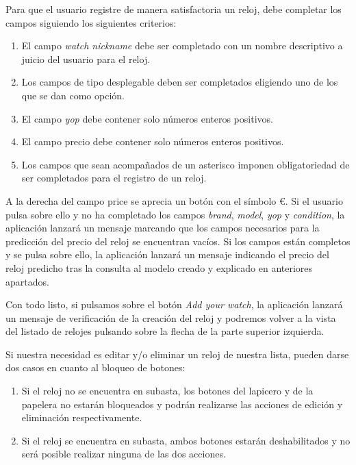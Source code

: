 
	Para que el usuario registre de manera satisfactoria un reloj, debe completar los campos siguiendo los siguientes criterios:
	
	\begin{enumerate}
		\item El campo \emph{watch nickname} debe ser completado con un nombre descriptivo a juicio del usuario para el reloj.
		\item Los campos de tipo desplegable deben ser completados eligiendo uno de los que se dan como opción.
		\item El campo \emph{yop} debe contener solo números enteros positivos.
		\item El campo precio debe contener solo números enteros positivos.
		\item Los campos que sean acompañados de un asterisco imponen obligatoriedad de ser completados para el registro de un reloj.
	\end{enumerate}
	
	A la derecha del campo price se aprecia un botón con el símbolo €. Si el usuario pulsa sobre ello y no ha completado los campos \emph{brand}, \emph{model}, \emph{yop} y \emph{condition}, la aplicación lanzará un mensaje marcando que los campos necesarios para la predicción del precio del reloj se encuentran vacíos. Si los campos están completos y se pulsa sobre ello, la aplicación lanzará un mensaje indicando el precio del reloj predicho tras la consulta al modelo creado y explicado en anteriores apartados.
	
	Con todo listo, si pulsamos sobre el botón \emph{Add your watch}, la aplicación lanzará un mensaje de verificación de la creación del reloj y podremos volver a la vista del listado de relojes pulsando sobre la flecha de la parte superior izquierda.

	Si nuestra necesidad es editar y/o eliminar un reloj de nuestra lista, pueden darse dos casos en cuanto al bloqueo de botones:
	\begin{enumerate}
		\item Si el reloj no se encuentra en subasta, los botones del lapicero y de la papelera no estarán bloqueados y podrán realizarse las acciones de edición y eliminación respectivamente.
		\item Si el reloj se encuentra en subasta, ambos botones estarán deshabilitados y no será posible realizar ninguna de las dos acciones.
	\end{enumerate}
	

